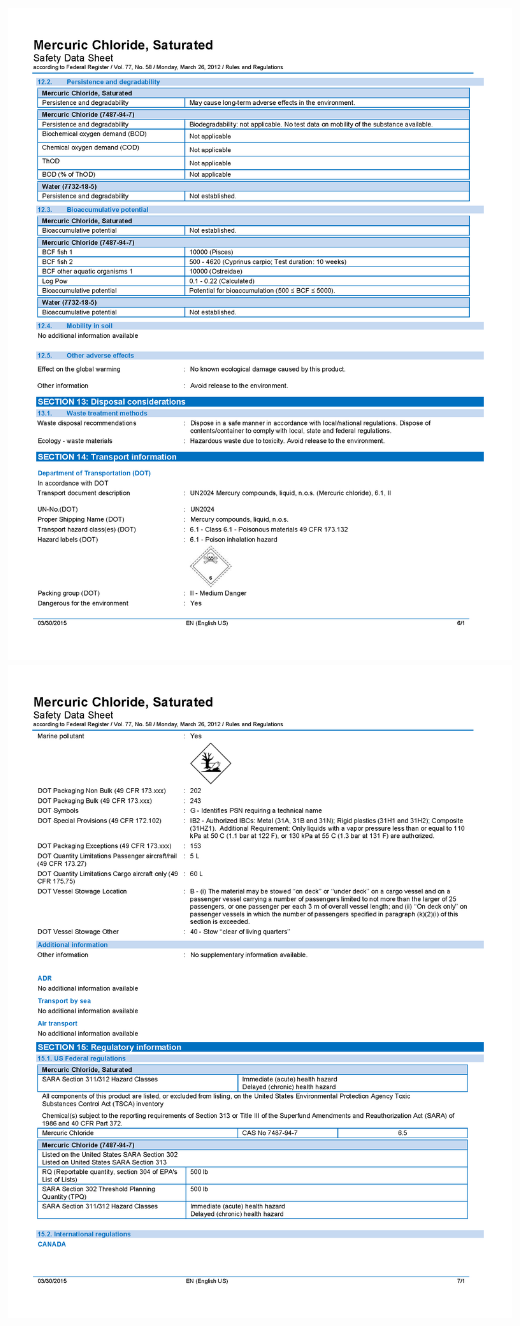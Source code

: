 \documentclass[]{book}
\begin{document}
\includegraphics[width=1\textwidth,height=\textheight]{images/Saturated-Mercuric-Chloride-SDS_Page_6.png}
\includegraphics[width=1\textwidth,height=\textheight]{images/Saturated-Mercuric-Chloride-SDS_Page_7.png}
\end{document}
